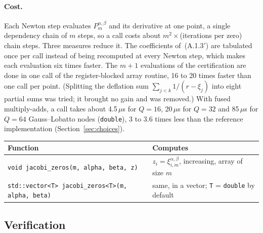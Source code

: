 \documentclass[11pt,a4paper]{article}
\newcommand{\Pab}[1]{P_{#1}^{\alpha,\beta}}     %
\newcommand{\code}[1]{\texttt{#1}}
\begin{document}
\paragraph{Cost.}
Each Newton step evaluates $\Pab{m}$ and its derivative at one point, a
single dependency chain of $m$ steps, so a call costs about
$m^2\times$(iterations per zero) chain steps. Three measures reduce it. The
coefficients of~(A.1.3$'$) are tabulated once per call instead of being
recomputed at every Newton step, which makes each evaluation six times
faster. The $m+1$ evaluations of the certification are done in one call of
the register-blocked array routine, 16 to 20 times faster than one call per
point. (Splitting the deflation sum $\sum_{j<k}1/(r-\xi_j)$ into eight
partial sums was tried; it brought no gain and was removed.) With fused multiply-adds, a call
takes about 4.5\,$\mu$s for $Q=16$, 20\,$\mu$s for $Q=32$ and 85\,$\mu$s for
$Q=64$ Gauss--Lobatto nodes (\code{double}), 3 to 3.6 times less than the
reference implementation (Section~\ref{sec:choices}).

\begin{center}
\begin{tabular}{@{}l>{\raggedright\arraybackslash}p{}@{}}
\toprule
Function & Computes \\
\midrule
\code{void jacobi\_zeros(m, alpha, beta, z)} & $z_i=\xi^{\alpha,\beta}_{i,m}$, increasing, array of size $m$ \\
\code{std::vector<T> jacobi\_zeros<T>(m, alpha, beta)} & same, in a vector; \code{T} = \code{double} by default \\
\bottomrule
\end{tabular}
\end{center}

\subsection{Verification}
\end{document}
